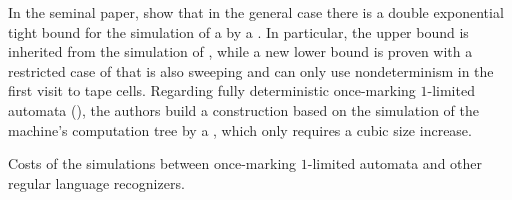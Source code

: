 In the seminal paper, \citeauthor{PigPri23a} show that in the general case there is a double exponential tight bound for the simulation of a \OMOLA by a \ODFA \cite{PigPri23a}.
In particular, the upper bound is inherited from the simulation of \OLA, while a new lower bound is proven with a restricted case of \OMOLA that is also sweeping and can only use nondeterminism in the first visit to tape cells.
Regarding fully deterministic once-marking $1$-limited automata (\OMODLA), the authors build a construction based on the simulation of the machine's computation tree by a \TDFA, which only requires a cubic size increase.

\begin{table}
	\centering
	\caption{Costs of the simulations between once-marking $1$-limited automata and other regular language recognizers.}
	\label{tab:sims-om-general-oncemarking}
\end{table}


